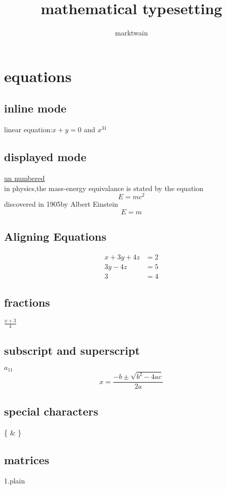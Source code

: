 \documentclass[12pt]{book}
\begin{document}
\title{mathematical typesetting}
\author{marktwain}
\maketitle
\chapter{equations}
\section{inline mode}
linear equation:$ x+y=0 $ and $x^{31} $
\section{displayed mode}
\underline{un numbered}\\
in physics,the mass-energy equivalance is stated by the equation $$ E=mc^2 $$ discovered in 1905by Albert Einstein\\
\begin{equation*}
E=m
\end{equation*}

\section{Aligning Equations}
\begin{align*}
x + 3y + 4z &=2 \\
 3y - 4z &= 5 \\
 3 &= 4
 \end{align*}
 
\section{fractions}
$ \frac{x+3}{4} $

 \section{subscript and superscript}
$ a_{11} $
$$ x=\frac{-b \pm  \sqrt{b^2-4ac}} {2a}$$

\section{special characters}
\{ \& \}  
 
\section{matrices}
1.plain\\
\end{document}
